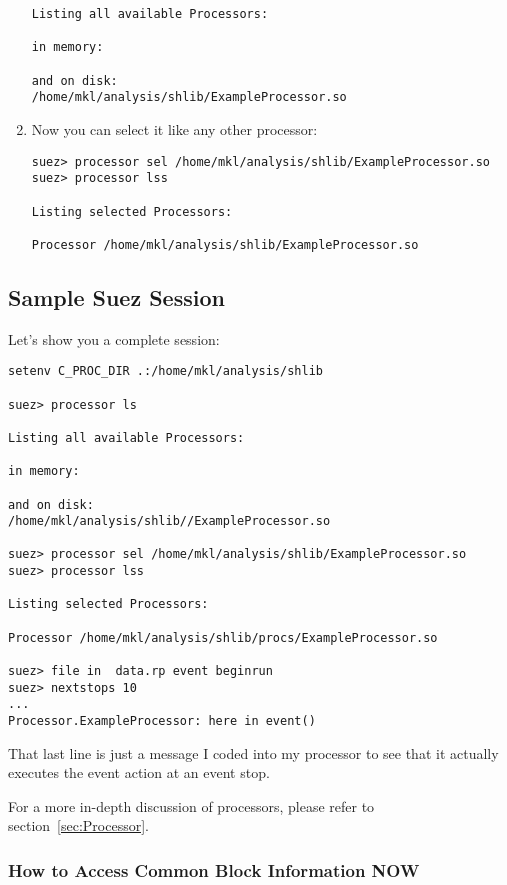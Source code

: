 \documentclass[12pt]{article}
\begin{document}
\begin{enumerate}
\begin{verbatim}
Listing all available Processors:

in memory:

and on disk:
/home/mkl/analysis/shlib/ExampleProcessor.so
\end{verbatim}

\item Now you can select it like any other processor:
%
\begin{verbatim}
suez> processor sel /home/mkl/analysis/shlib/ExampleProcessor.so
suez> processor lss

Listing selected Processors:

Processor /home/mkl/analysis/shlib/ExampleProcessor.so
\end{verbatim}

\end{enumerate}

\subsection{Sample Suez Session}
\label{tutorial-SuezSession}

Let's show you a complete session:
%
\begin{verbatim}
setenv C_PROC_DIR .:/home/mkl/analysis/shlib

suez> processor ls

Listing all available Processors:

in memory:

and on disk:
/home/mkl/analysis/shlib//ExampleProcessor.so

suez> processor sel /home/mkl/analysis/shlib/ExampleProcessor.so
suez> processor lss

Listing selected Processors:

Processor /home/mkl/analysis/shlib/procs/ExampleProcessor.so

suez> file in  data.rp event beginrun
suez> nextstops 10
...
Processor.ExampleProcessor: here in event()
\end{verbatim}
%
That last line is just a message I coded into my processor to see that
it actually executes the event action at an event stop.

For a more in-depth discussion of processors, please refer to
section~\ref{sec:Processor}.


\subsubsection{How to Access Common Block Information NOW }
\label{sec:howto-access-commonblocks}
\end{document}
